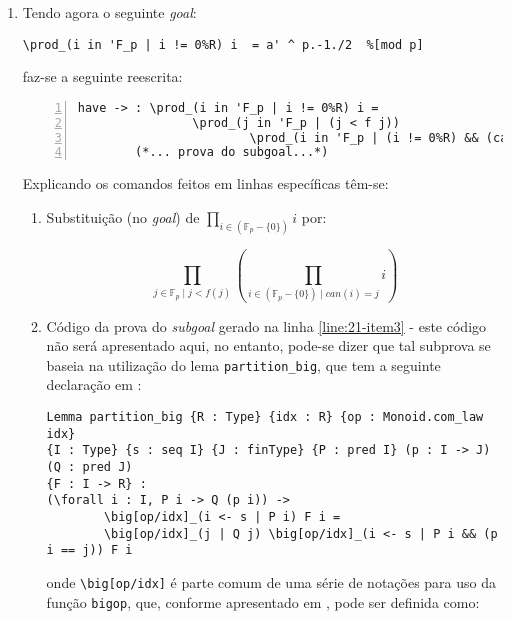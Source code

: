 \begin{enumerate}[label=\textbf{\roman*.}]
        \item Tendo agora o seguinte \textit{goal}:
                \begin{lstlisting}[language=coq,frame=single,tabsize=1]
\prod_(i in 'F_p | i != 0%R) i  = a' ^ p.-1./2  %[mod p]
                \end{lstlisting}
        faz-se a seguinte reescrita:
                \begin{lstlisting}[language=coq,frame=single, numbers=left,stepnumber=1,tabsize=1,escapechar=@, name=proof]
have -> : \prod_(i in 'F_p | i != 0%R) i =                      @ \label{line:21-item3} @
                \prod_(j in 'F_p | (j < f j))
                        \prod_(i in 'F_p | (i != 0%R) && (can i == j)) i.
        (*... prova do subgoal...*)                             @ \label{line:24-item3} @
                \end{lstlisting}
        
        Explicando os comandos feitos em linhas específicas têm-se:
        \begin{enumerate}[listparindent=\parindent]

                \item[\textbf{(\ref{line:21-item3})}] Substituição (no \textit{goal}) de $\prod_{i \in (\mathbb{F}_p - \{0\})} i$ por:
                
                        \begin{equation*}
                        \prod_{j \in \mathbb{F}_p \mid j < f(j)} \left( \prod_{i \in (\mathbb{F}_p - \{0\}) \mid can(i)= j} i \right)
                        \end{equation*}

                \item[\textbf{(\ref{line:24-item3})}] Código da prova do \textit{subgoal} gerado na linha \ref{line:21-item3} - este código não será apresentado aqui, no entanto, pode-se dizer que tal subprova se baseia na utilização do lema \lstinline[language=coq]|partition_big|, que tem a seguinte declaração em \cite{mathcomp-bigop}:
                
                        \begin{lstlisting}[language=coq,frame=single,tabsize=1]
Lemma partition_big {R : Type} {idx : R} {op : Monoid.com_law idx} 
{I : Type} {s : seq I} {J : finType} {P : pred I} (p : I -> J) (Q : pred J) 
{F : I -> R} :
(\forall i : I, P i -> Q (p i)) ->
        \big[op/idx]_(i <- s | P i) F i =
        \big[op/idx]_(j | Q j) \big[op/idx]_(i <- s | P i && (p i == j)) F i
                        \end{lstlisting}
                onde \lstinline[language=coq]|\big[op/idx]| é parte comum de uma série de notações para uso da função \lstinline[language=coq]|bigop|, que, conforme apresentado em \cite{assia_mahboubi_2022_7118596}, pode ser definida como:


\end{enumerate}
\end{enumerate}
